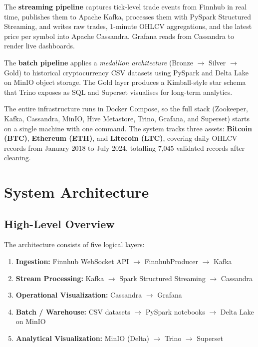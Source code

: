\documentclass[a4paper]{article}
\begin{document}
The \textbf{streaming pipeline} captures tick-level trade events from Finnhub
in real time, publishes them to Apache Kafka, processes them with PySpark
Structured Streaming, and writes raw trades, 1-minute OHLCV aggregations, and
the latest price per symbol into Apache Cassandra. Grafana reads from Cassandra
to render live dashboards.

The \textbf{batch pipeline} applies a \emph{medallion architecture}
(Bronze $\rightarrow$ Silver $\rightarrow$ Gold) to historical cryptocurrency CSV
datasets using PySpark and Delta Lake on MinIO object storage. The Gold layer
produces a Kimball-style star schema that Trino exposes as SQL and Superset
visualises for long-term analytics.

The entire infrastructure runs in Docker Compose, so the full stack (Zookeeper,
Kafka, Cassandra, MinIO, Hive Metastore, Trino, Grafana, and Superset) starts
on a single machine with one command. The system tracks three assets:
\textbf{Bitcoin (BTC)}, \textbf{Ethereum (ETH)}, and \textbf{Litecoin (LTC)},
covering daily OHLCV records from January 2018 to July 2024, totalling 7,045
validated records after cleaning.

\section{System Architecture}

\subsection{High-Level Overview}

The architecture consists of five logical layers:

\begin{enumerate}
    \item \textbf{Ingestion:} Finnhub WebSocket API $\rightarrow$ FinnhubProducer $\rightarrow$ Kafka
    \item \textbf{Stream Processing:} Kafka $\rightarrow$ Spark Structured Streaming $\rightarrow$ Cassandra
    \item \textbf{Operational Visualization:} Cassandra $\rightarrow$ Grafana
    \item \textbf{Batch / Warehouse:} CSV datasets $\rightarrow$ PySpark notebooks $\rightarrow$ Delta Lake on MinIO
    \item \textbf{Analytical Visualization:} MinIO (Delta) $\rightarrow$ Trino $\rightarrow$ Superset
\end{enumerate}
\end{document}

